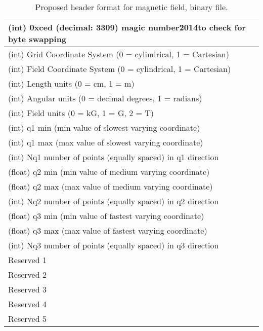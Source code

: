 \begin{table}[t!]
\begin{center}
\begin{tabular}{|l|}\hline
(int) 0xced (decimal: 3309) magic number\u2014to check for byte swapping \\[2pt] \hline
(int) Grid Coordinate System (0 = cylindrical, 1 = Cartesian) \\[2pt] \hline
(int) Field Coordinate System (0 = cylindrical, 1 = Cartesian) \\[2pt] \hline
(int) Length units (0 = cm, 1 = m) \\[2pt] \hline
(int) Angular units (0 = decimal degrees, 1 = radians) \\[2pt] \hline
(int) Field units (0 = kG, 1 = G, 2 = T) \\[2pt] \hline
(int) q1 min (min value of slowest varying coordinate) \\[2pt] \hline
(int) q1 max (max value of slowest varying coordinate) \\[2pt] \hline
(int) Nq1 number of points (equally spaced) in q1 direction \\[2pt] \hline
(float) q2 min (min value of medium varying coordinate) \\[2pt] \hline
(float) q2 max (max value of medium varying coordinate) \\[2pt] \hline
(int) Nq2 number of points (equally spaced) in q2 direction \\[2pt] \hline
(float) q3 min (min value of fastest varying coordinate) \\[2pt] \hline
(float) q3 max (max value of fastest varying coordinate) \\[2pt] \hline
(int) Nq3 number of points (equally spaced) in q3 direction \\[2pt] \hline
Reserved 1 \\[2pt] \hline
Reserved 2 \\[2pt] \hline
Reserved 3 \\[2pt] \hline
Reserved 4 \\[2pt] \hline
Reserved 5 \\[2pt] \hline
\end{tabular}
\caption{Proposed header format for magnetic field, binary file.}\label{magfieldfileheader}
\end{center}
\end{table}
 
